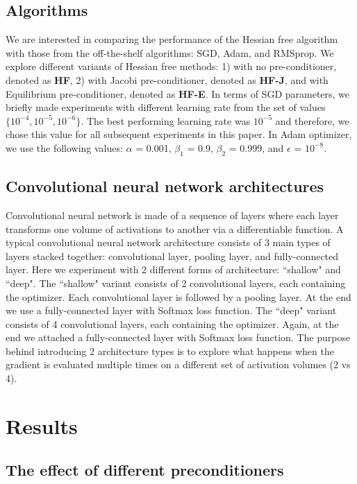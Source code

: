 \documentclass[10pt,twocolumn,letterpaper]{article}
\begin{document}
\subsection{Algorithms}    
   
We are interested in comparing the performance of the Hessian free algorithm with those from the off-the-shelf algorithms: SGD, Adam, and RMSprop. We explore different variants of Hessian free methods: 1) with no pre-conditioner, denoted as \textbf{HF}, 2) with Jacobi pre-conditioner, denoted as \textbf{HF-J}, and with Equilibrium pre-conditioner, denoted as \textbf{HF-E}. In terms of SGD parameters, we briefly made experiments with different learning rate from the set of values $\{10^{-4}, 10^{-5}, 10^{-6} \}$. The best performing learning rate was $10^{-5}$ and therefore, we chose this value for all subsequent experiments in this paper. In Adam optimizer, we use the following values: $\alpha$ = 0.001, $\beta_1$ = 0.9, $\beta_2$ = 0.999, and $\epsilon$ = $10^{−8}$.

\subsection{Convolutional neural network architectures}

Convolutional neural network is made of a sequence of layers where each layer transforms one volume of activations to another via a differentiable function. A typical convolutional neural network architecture consists of 3 main types of layers stacked together: convolutional layer, pooling layer, and fully-connected layer. Here we experiment with 2 different forms of architecture: ``shallow" and ``deep". The ``shallow" variant consists of 2 convolutional layers, each containing the optimizer. Each convolutional layer is followed by a pooling layer. At the end we use a fully-connected layer with Softmax loss function. The ``deep" variant consists of 4 convolutional layers, each containing the optimizer. Again, at the end we attached a fully-connected layer with Softmax loss function. The purpose behind introducing 2 architecture types is to explore what happens when the gradient is evaluated multiple times on a different set of activation volumes (2 vs 4).



\section{Results}
\subsection{The effect of different preconditioners}  
\label{sec:prec}
   
\end{document}
